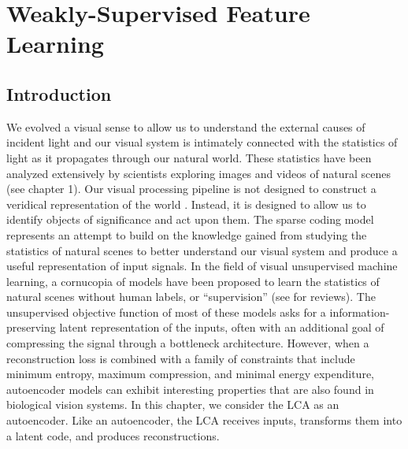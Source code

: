 

\section{Weakly-Supervised Feature Learning}\label{sec:ch3_weak_supervised_learning}
\subsection{Introduction}
We evolved a visual sense to allow us to understand the external causes of incident light and our visual system is intimately connected with the statistics of light as it propagates through our natural world.
These statistics have been analyzed extensively by scientists exploring images and videos of natural scenes (see chapter 1). %
Our visual processing pipeline is not designed to construct a veridical representation of the world \parencite{gollisch2010eye}.
Instead, it is designed to allow us to identify objects of significance and act upon them.
The sparse coding model represents an attempt to build on the knowledge gained from studying the statistics of natural scenes to better understand our visual system and produce a useful representation of input signals.
In the field of visual unsupervised machine learning, a cornucopia of models have been proposed to learn the statistics of natural scenes without human labels, or ``supervision'' (see \parencite{baldi2012autoencoders, bengio2012unsupervised, goodfellow2016deep} for reviews).
The unsupervised objective function of most of these models asks for a information-preserving latent representation of the inputs, often with an additional goal of compressing the signal through a bottleneck architecture.
However, when a reconstruction loss is combined with a family of constraints that include minimum entropy, maximum compression, and minimal energy expenditure, autoencoder models can exhibit interesting properties that are also found in biological vision systems.
In this chapter, we consider the LCA as an autoencoder.
Like an autoencoder, the LCA receives inputs, transforms them into a latent code, and produces reconstructions.
